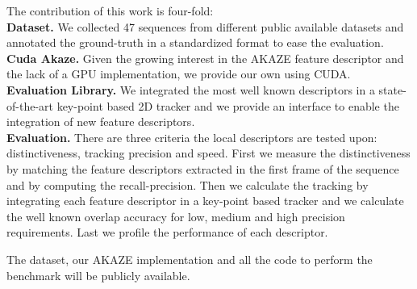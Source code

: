 \documentclass[letterpaper, 10pt, conference]{ieeeconf}
\begin{document}
The contribution of this work is four-fold:\\
\textbf{Dataset.} We collected 47 sequences from different public available datasets and annotated the ground-truth in a standardized format to ease the evaluation.\\
\textbf{Cuda Akaze.} Given the growing interest in the AKAZE feature descriptor and the lack of a GPU implementation, we provide our own using CUDA.\\
\textbf{Evaluation Library.} We integrated the most well known descriptors in a state-of-the-art key-point based 2D tracker and we provide an interface to enable the integration of new feature descriptors.\\
\textbf{Evaluation.}  There are three criteria the local descriptors are tested upon: distinctiveness, tracking precision and speed. First we measure the distinctiveness by matching the feature descriptors extracted in the first frame of the sequence and by computing the recall-precision. Then we calculate the tracking by integrating each feature descriptor in a key-point based tracker and we calculate the well known overlap accuracy for low, medium and high precision requirements. Last we profile the performance of each descriptor.

The dataset, our AKAZE implementation and all the code to perform the benchmark will be publicly available.





%










%
\end{document}
